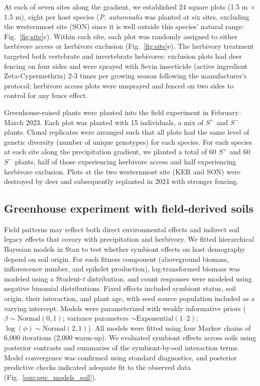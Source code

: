 \documentclass[12pt]{article}\usepackage[]{graphicx}\usepackage[dvipsnames]{xcolor}
\begin{document}
At each of seven sites along the gradient, we established 24 square plots (1.5 m $\times$ 1.5 m), eight per host species (\textit{P. autumnalis} was planted at six sites, excluding the westernmost site (SON) since it is well outside this species' natural range: Fig.~\ref{fig:site}c). 
Within each site, each plot was randomly assigned to either herbivore access or herbivore exclusion (Fig.~\ref{fig:site}e). 
The herbivory treatment targeted both vertebrate and invertebrate hebivores: exclusion plots had deer fencing on four sides and were sprayed with Sevin insecticide (active ingredient Zeta-Cypermethrin) 2-3 times per growing season following the manufacturer's protocol; herbivore access plots were unsprayed and fenced on two sides to control for any fence effect.

Greenhouse-raised plants were planted into the field experiment in February--March 2023.
Each plot was planted with 15 individuals, a mix of $S^+$ and $S^-$ plants. 
Clonal replicates were arranged such that all plots had the same level of genetic diversity (number of unique genotypes) for each species.  
For each species at each site along the precipitation gradient, we planted a total of 60 $S^+$ and 60 $S^-$ plants, half of those experiencing herbivore access and half experiencing herbivore exclusion. 
Plots at the two westernmost site (KER and SON) were destroyed by deer and subsequently replanted in 2024 with stronger fencing. 

\subsection*{Greenhouse experiment with field-derived soils}
Field patterns may reflect both direct environmental effects and indirect soil legacy effects that covary with precipitation and herbivory.  
We fitted hierarchical Bayesian models in Stan to test whether symbiont effects on host demography depend on soil origin.  
For each fitness component (aboveground biomass, inflorescence number, and spikelet production), log-transformed biomass was modeled using a Student-\emph{t} distribution, and count responses were modeled using negative binomial distributions.  
Fixed effects included symbiont status, soil origin, their interaction, and plant age, with seed source population included as a varying intercept.  
Models were parameterized with weakly informative priors ($\beta \sim \mathrm{Normal}(0,1)$; variance parameters $\sim \mathrm{Exponential}(1\text{--}2)$; $\log(\phi) \sim \mathrm{Normal}(2,1)$).  
All models were fitted using four Markov chains of 6,000 iterations (2,000 warm-up).  
We evaluated symbiont effects across soils using posterior contrasts and summaries of the symbiont-by-soil interaction terms.  
Model convergence was confirmed using standard diagnostics, and posterior predictive checks indicated adequate fit to the observed data (Fig.~\ref{sup:ppc_models_soil}).
\end{document}
